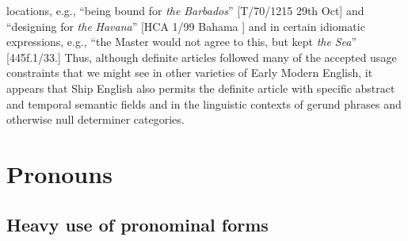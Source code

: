 locations, e.g., “being bound for \textit{the} \textit{Barbados}” [T/70/1215 29th Oct] and “designing for \textit{the} \textit{Havana}” [HCA 1/99 Bahama \citealt{Islands1722}] and in certain idiomatic expressions, e.g., “the Master would not agree to this, but kept \textit{the} \textit{Sea}” [445f.1/33.] Thus, although definite articles followed many of the accepted usage constraints that we might see in other varieties of Early Modern English, it appears that Ship English also permits the definite article with specific abstract and temporal semantic fields and in the linguistic contexts of gerund phrases and otherwise null determiner categories. 

\section{\textbf{Pronouns}}%

\subsection{\textbf{Heavy} \textbf{use} \textbf{of} \textbf{pronominal} \textbf{forms}}%


